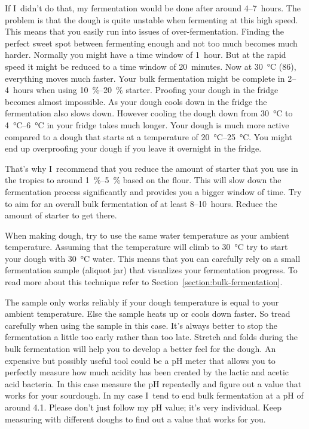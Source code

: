 If I~didn't do that, my fermentation would be done after
around 4--7~hours. The problem is that the dough is quite
unstable when fermenting at this high speed. This means
that you easily run into issues of over-fermentation.
Finding the perfect sweet spot between fermenting enough
and not too much becomes much harder. Normally you might
have a time window of 1~hour. But at the rapid speed it
might be reduced to a time window of 20~minutes. Now at
\qty{30}{\degreeCelsius} (\qty{86}{\degF}), everything moves much faster. Your
bulk fermentation might be complete in 2--4~hours when using
\qtyrange{10}{20}{\percent} starter. Proofing your dough in the fridge becomes
almost impossible. As your dough cools down in the fridge the fermentation
also slows down. However cooling the dough down from \qty{30}{\degreeCelsius}
to \qtyrange{4}{6}{\degreeCelsius} in your fridge takes much longer. Your
dough is much more active compared to a dough that starts at a temperature of
\qtyrange{20}{25}{\degreeCelsius}. You might end up overproofing your dough if
you leave it overnight in the fridge.

That's why I~recommend that you reduce the amount of starter
that you use in the tropics to around \qtyrange{1}{5}{\percent}
based on the flour. This will slow down the fermentation
process significantly and provides you a bigger window
of time. Try to aim for an overall bulk fermentation of at
least 8--10~hours. Reduce the amount of starter to get there.

When making dough, try to use the same water temperature
as your ambient temperature. Assuming that the temperature
will climb to \qty{30}{\degreeCelsius} try to start your dough
with \qty{30}{\degreeCelsius} water. This means that you can carefully rely on
a small fermentation sample (aliquot jar) that visualizes your fermentation
progress. To read more about this technique refer
to Section~\ref{section:bulk-fermentation}.

The sample only works reliably if your dough temperature
is equal to your ambient temperature. Else the sample heats
up or cools down faster. So tread carefully when using
the sample in this case. It's always better to stop
the fermentation a little too early rather than too late.
Stretch and folds during the bulk fermentation
will help you to develop a better feel for
the dough. An expensive but possibly useful tool
could be a pH meter that allows you to perfectly
measure how much acidity has been created by the
lactic and acetic acid bacteria. In this case measure
the pH repeatedly and figure out a value that works
for your sourdough. In my case I~tend to end bulk
fermentation at a pH of around 4.1. Please don't just
follow my pH value; it's very individual. Keep measuring
with different doughs to find out a value that works for you.

